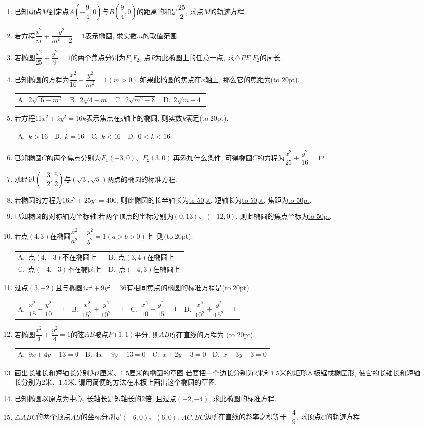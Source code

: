 \documentclass[10pt,a4paper]{article}
\newcommand{\blank}[1]{\underline{\hbox to #1pt{}}}
\newcommand{\bracket}[1]{(\hbox to #1pt{})}
\newcommand{\twoch}[4]{\par\begin{tabular}{p{.46\textwidth}p{.46\textwidth}}
A.~#1& B.~#2\\
C.~#3& D.~#4
\end{tabular}}
\newcommand{\fourch}[4]{\par\begin{tabular}{p{.23\textwidth}p{.23\textwidth}p{.23\textwidth}p{.23\textwidth}}
A.~#1 &B.~#2& C.~#3& D.~#4
\end{tabular}}
\begin{document}
\begin{enumerate}[1.]
\item 已知动点$M$到定点$A(-\dfrac 94,0)$与$B(\dfrac 94,0)$的距离的和是$\dfrac{25}2$, 求点$M$的轨迹方程.
\item 若方程$\dfrac{x^2}m+\dfrac{y^2}{{m^2}-2}=1$表示椭圆, 求实数$m$的取值范围.
\item 若椭圆$\dfrac{x^2}{25}+\dfrac{y^2}9=1$的两个焦点分别为$F_1F_2$, 点$P$为此椭圆上的任意一点, 求$\triangle PF_1F_2$的周长.
\item 已知椭圆的方程为$\dfrac{x^2}{16}+\dfrac{y^2}{m^2}=1(m>0)$.如果此椭圆的焦点在$x$轴上, 那么它的焦距为\bracket{20}.
\fourch{$2\sqrt {16-m^2}$}{$2\sqrt {4-m}$}{$2\sqrt {m^2-8}$}{$2\sqrt {m-4}$}
\item 若方程$16x^2+ky^2=16k$表示焦点在$y$轴上的椭圆, 则实数$k$满足\bracket{20}.
\fourch{$k>16$}{$k=16$}{$k<16$}{$0<k<16$}
\item 已知椭圆$C$的两个焦点分别为$F_1(-3,0)$、$F_2(3,0)$.再添加什么条件, 可得椭圆$C$的方程为$\dfrac{x^2}{25}+\dfrac{y^2}{16}=1$?
\item 求经过$(-\dfrac 32,\dfrac 52)$与$(\sqrt 3,\sqrt 5)$两点的椭圆的标准方程.
\item 若椭圆的方程为$16x^2+25y^2=400$, 则此椭圆的长半轴长为\blank{50}, 短轴长为\blank{50}, 焦距为\blank{50}.
\item 已知椭圆的对称轴为坐标轴.若两个顶点的坐标分别为$(0,13)$、$(-12,0)$, 则此椭圆的焦点坐标为\blank{50}.
\item 若点$(4,3)$在椭圆$\dfrac{x^2}{a^2}+\dfrac{y^2}{b^2}=1(a>b>0)$上, 则\bracket{20}.
\twoch{点$(4,-3)$不在椭圆上}{点$(3,4)$在椭圆上}{点$(-4,-3)$不在椭圆上}{点$(-4,3)$在椭圆上}
\item 过点$(3,-2)$且与椭圆$4x^2+9y^2=36$有相同焦点的椭圆的标准方程是\bracket{20}.
\fourch{$\dfrac{x^2}{15}+\dfrac{y^2}{10}=1$}{$\dfrac{x^2}{{{15}^2}}+\dfrac{y^2}{{{10}^2}}=1$}{$\dfrac{x^2}{10}+\dfrac{y^2}{15}=1$}{$\dfrac{x^2}{{{10}^2}}+\dfrac{y^2}{{{15}^2}}=1$}
\item 若椭圆$\dfrac{x^2}9+\dfrac{y^2}4=1$的弦$AB$被点$P(1,1)$平分, 则$AB$所在直线的方程为 \bracket{20}.
\fourch{$9x+4y-13=0$}{$4x+9y-13=0$}{$x+2y-3=0$}{$x+3y-3=0$}
\item 画出长轴长和短轴长分别为$2$厘米、$1.5$厘米的椭圆的草图.若要把一个边长分别为$2$米和$1.5$米的矩形木板锯成椭圆形, 使它的长轴长和短轴长分别为$2$米、$1.5$米, 请用简便的方法在木板上画出这个椭圆的草图.
\item 已知椭圆以原点为中心, 长轴长是短轴长的$2$倍, 且过点$(-2,-4)$, 求此椭圆的标准方程.
\item $\triangle ABC$的两个顶点$AB$的坐标分别是$(-6,0)$、$(6,0)$, $AC,BC$边所在直线的斜率之积等于$-\dfrac 49$, 求顶点$C$的轨迹方程.

\end{enumerate}
\end{document}
